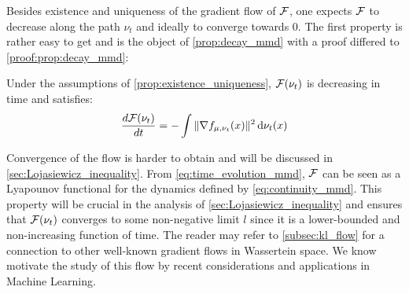 Besides existence and uniqueness of the gradient flow of ${{\mathcal F}}$, one expects ${{\mathcal F}}$ to decrease along the path $\nu_t$ and ideally to converge towards $0$. The first property is rather easy to get and is the object of \cref{prop:decay_mmd} with a proof differed to \cref{proof:prop:decay_mmd}: 
\begin{proposition}\label{prop:decay_mmd}
	Under the assumptions of \cref{prop:existence_uniqueness}, ${{\mathcal F}}(\nu_t)$ is decreasing in time and satisfies:
	\begin{align}\label{eq:time_evolution_mmd}
		\frac{d{{\mathcal F}}(\nu_t)}{dt}= - \int \Vert \nabla f_{\mu,\nu_t}(x) \Vert^2 \mathop{}\!\mathrm{d} \nu_t(x)  
	\end{align}
\end{proposition}
Convergence of the flow is harder to obtain and will be discussed in \cref{sec:Lojasiewicz_inequality}.
From \cref{eq:time_evolution_mmd}, ${{\mathcal F}}$ can be seen as a Lyapounov functional for the dynamics defined by \cref{eq:continuity_mmd}. This property will be crucial in the analysis of \cref{sec:Lojasiewicz_inequality} and ensures that ${{\mathcal F}}(\nu_t)$  converges to some non-negative limit $l$ since it is a lower-bounded and non-increasing function of time. The reader may refer to \cref{subsec:kl_flow} for a connection to other well-known gradient flows in Wassertein space. We know motivate the study of this flow by recent considerations and applications in Machine Learning.

 

